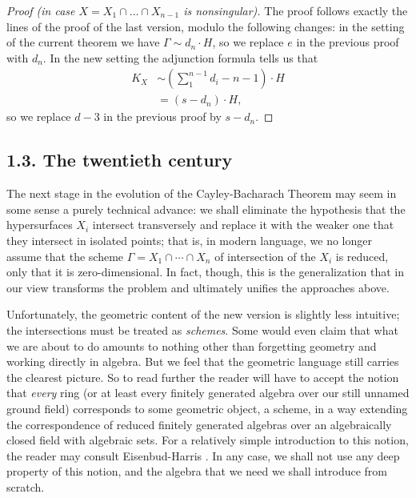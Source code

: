 \documentclass{bull-l}
\theoremstyle{pplain}
\theoremstyle{definition}
\begin{document}
\begin{proof}[Proof \rm (in case $X=X_1\cap \dots\cap X_{n-1}$ is nonsingular)]
The proof follows exactly the lines of the proof of the last version, modulo
the following changes: in the setting of the current theorem we have
$\Gamma\sim d_n\cdot H$, so we replace $e$ in the previous proof with $d_n$. 
In the new setting the adjunction formula tells us that
\begin{equation*} 
\begin{split}
K_X&\sim \left(\sum^{n-1}_1 d_i-n-1\right) \cdot H\\
&=(s-d_n)\cdot H,
\end{split}
\end{equation*}
so we replace $d-3$ in the previous proof by $s-d_n$.
\end{proof}

\subsection*{{\rm 1.3.} The twentieth century}
The next stage in the evolution of the Cayley-Bacharach Theorem may seem in
some sense a purely technical advance: we shall eliminate the hypothesis that
the hypersurfaces $X_i$ intersect transversely and replace it with the weaker
one that they intersect in isolated points; that is, in modern language, we no
longer assume that the scheme $\Gamma=X_1\cap \cdots \cap X_n$ of intersection
of the $X_i$ is reduced, only that it is zero-dimensional.  In fact, though,
this is the generalization that in our view transforms the problem and
ultimately unifies the approaches above.

Unfortunately, the geometric content of the new version is slightly less
intuitive; the intersections must be treated as \emph{schemes}.  Some would
even claim that what we are about to do amounts to nothing other than
forgetting geometry and working directly in algebra.  But we feel that the
geometric language still carries the clearest picture.  
So to read further the reader will have to accept the notion that
\emph{every} ring (or at least every finitely generated algebra over our still
unnamed ground field) corresponds to some geometric object, a scheme, in a way
extending the correspondence of reduced finitely generated algebras over an 
algebraically closed field with algebraic sets.  For a relatively simple
introduction to this notion, the reader may consult Eisenbud-Harris
\cite{EH2}.  In any case, we shall not use any deep property of this notion,
and the algebra that we need we shall introduce from scratch.
\end{document}
